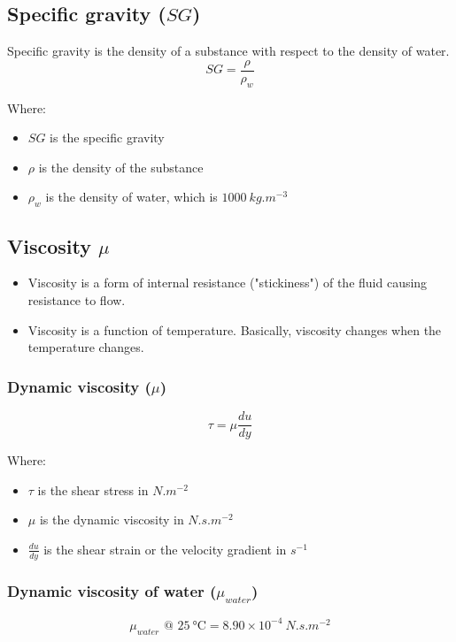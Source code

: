 \documentclass[11pt]{article}
\begin{document}
\subsection{Specific gravity (\(SG\))}
\label{sec:orgf4e51c1}
Specific gravity is the density of a substance with respect to the density of water.
\[SG = \frac{\rho}{\rho_w}\]

Where:
\begin{itemize}
\item \(SG\) is the specific gravity
\item \(\rho\) is the density of the substance
\item \(\rho_w\) is the density of water, which is \(\qty{1000}{kg.m^{-3}}\)
\end{itemize}

\subsection{Viscosity \(\mu\)}
\label{sec:org29179a6}
\begin{itemize}
\item Viscosity is a form of internal resistance ("stickiness") of the fluid causing resistance to flow.
\item Viscosity is a function of temperature. Basically, viscosity changes when the temperature changes.
\end{itemize}

\subsubsection{Dynamic viscosity (\(\mu\))}
\label{sec:org177fa9c}
\[\tau = \mu \frac{du}{dy}\]

Where:
\begin{itemize}
\item \(\tau\) is the shear stress in \(\unit{N.m^{-2}}\)
\item \(\mu\) is the dynamic viscosity in \(\unit{N.s.m^{-2}}\)
\item \(\frac{du}{dy}\) is the shear strain or the velocity gradient in \(\unit{s^{-1}}\)
\end{itemize}

\subsubsection{Dynamic viscosity of water (\(\mu_{water}\))}
\label{sec:orge676a40}
\[\mu_{water} \text{ @ } \qty{25}{\degreeCelsius} = 8.90 \times 10^{-4} \ \unit{N.s.m^{-2}}\]
\end{document}
